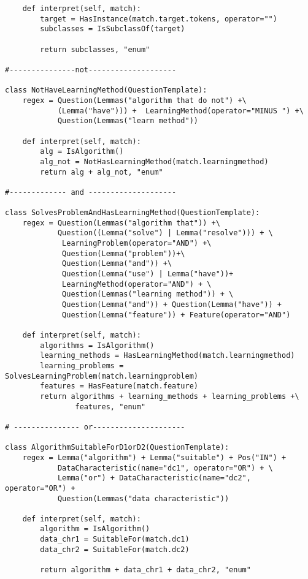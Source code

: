 \begin{verbatim}
    def interpret(self, match):
        target = HasInstance(match.target.tokens, operator="")
        subclasses = IsSubclassOf(target)

        return subclasses, "enum"
        
#---------------not-------------------- 

class NotHaveLearningMethod(QuestionTemplate):
    regex = Question(Lemmas("algorithm that do not") +\ 
            (Lemma("have"))) +  LearningMethod(operator="MINUS ") +\  
            Question(Lemmas("learn method"))

    def interpret(self, match):
        alg = IsAlgorithm()
        alg_not = NotHasLearningMethod(match.learningmethod)
        return alg + alg_not, "enum"

#------------- and --------------------

class SolvesProblemAndHasLearningMethod(QuestionTemplate):
    regex = Question(Lemmas("algorithm that")) +\ 
            Question((Lemma("solve") | Lemma("resolve"))) + \
             LearningProblem(operator="AND") +\ 
             Question(Lemma("problem"))+\
             Question(Lemma("and")) +\ 
             Question(Lemma("use") | Lemma("have"))+
             LearningMethod(operator="AND") + \
             Question(Lemmas("learning method")) + \
             Question(Lemma("and")) + Question(Lemma("have")) +
             Question(Lemma("feature")) + Feature(operator="AND")

    def interpret(self, match):
        algorithms = IsAlgorithm()
        learning_methods = HasLearningMethod(match.learningmethod)
        learning_problems = SolvesLearningProblem(match.learningproblem)
        features = HasFeature(match.feature)
        return algorithms + learning_methods + learning_problems +\ 
                features, "enum"

# --------------- or---------------------

class AlgorithmSuitableForD1orD2(QuestionTemplate):
    regex = Lemma("algorithm") + Lemma("suitable") + Pos("IN") + 
            DataCharacteristic(name="dc1", operator="OR") + \ 
            Lemma("or") + DataCharacteristic(name="dc2", operator="OR") +
            Question(Lemmas("data characteristic"))

    def interpret(self, match):
        algorithm = IsAlgorithm()
        data_chr1 = SuitableFor(match.dc1)
        data_chr2 = SuitableFor(match.dc2)

        return algorithm + data_chr1 + data_chr2, "enum"


\end{verbatim}
